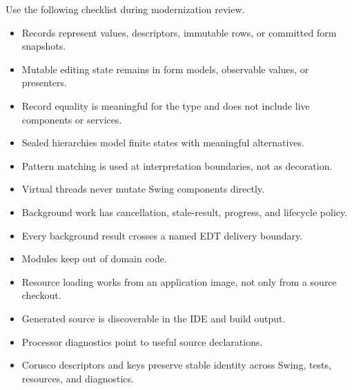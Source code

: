 Use the following checklist during modernization review.

\begin{itemize}
\item Records represent values, descriptors, immutable rows, or committed form snapshots.
\item Mutable editing state remains in form models, observable values, or presenters.
\item Record equality is meaningful for the type and does not include live components or services.
\item Sealed hierarchies model finite states with meaningful alternatives.
\item Pattern matching is used at interpretation boundaries, not as decoration.
\item Virtual threads never mutate Swing components directly.
\item Background work has cancellation, stale-result, progress, and lifecycle policy.
\item Every background result crosses a named EDT delivery boundary.
\item Modules keep  out of domain code.
\item Resource loading works from an application image, not only from a source checkout.
\item Generated source is discoverable in the IDE and build output.
\item Processor diagnostics point to useful source declarations.
\item Corusco descriptors and keys preserve stable identity across Swing, tests, resources, and diagnostics.
\end{itemize}


